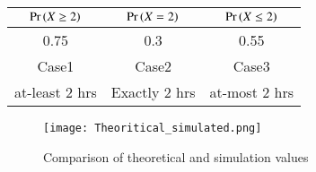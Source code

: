 \documentclass[journal,12pt,twocolumn]{IEEEtran}
\begin{document}
    \begin{center}
  
  \begin{tabular}{|c|c|c|}
    \hline
    $\Pr\left(X \geq 2\right)$ &  $\Pr \left(X = 2\right)$ & $\Pr\left(X \leq 2\right)$\\
    \hline
     0.75& 0.3& 0.55 \\
    \hline
    Case1 &Case2 &Case3\\
    \hline
    at-least 2 hrs &Exactly 2 hrs  &at-most 2 hrs\\
    \hline
\end{tabular}
\end{center}
\begin{figure}[ht]
    \centering
    \texttt{[image: Theoritical\_simulated.png]}
    \caption{Comparison of theoretical and simulation values}
    \label{Figure_1}
\end{figure}
\end{document}
